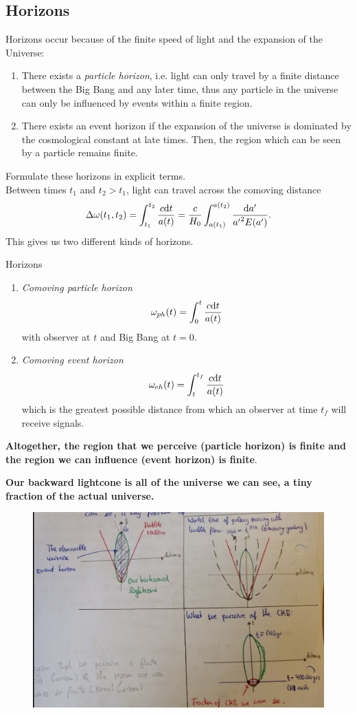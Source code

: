 \subsection{Horizons}
Horizons occur because of the finite speed of light and the expansion of the Universe:
\begin{enumerate}
	\item There exists a \emph{particle horizon}, i.e. light can only travel by a finite distance between the Big Bang and any later time, thus any particle in the universe can only be influenced by events within a finite region.
	\item There exists an event horizon if the expansion of the universe is dominated by the cosmological constant at late times. Then, the region which can be seen by a particle remains finite.
\end{enumerate}
Formulate these horizons in explicit terms.\\
Between times $t_1$ and $t_2 > t_1$, light can travel across the comoving distance
\begin{equation}
	\Delta \omega(t_1,t_2)= \int_{t_1}^{t_2} \frac{c \mathrm{d} t}{a(t)} = \frac{c}{H_0} \int_{a(t_1)}^{a(t_2)} \frac{\mathrm{d} a^\prime}{{a^\prime}^2 E(a^\prime)}.
\end{equation}
This gives us two different kinds of horizons.
\begin{mybox}{Horizons}
	\begin{enumerate} 
		\item 
	\emph{Comoving particle horizon}
	\begin{equation}
		\omega_{ph}(t)=\int_0^t \frac{c \mathrm{d} t}{a(t)}
	\end{equation}
	with observer at $t$ and Big Bang at $t=0$.
	\item \emph{Comoving event horizon}
	\begin{equation}
		\omega_{eh} (t) = \int_t^{t_f} \frac{c \mathrm{d} t}{a(t) }
	\end{equation}
	which is the greatest possible distance from which an observer at time $t_f$ will receive signals.
\end{enumerate}
\textbf{Altogether, the region that we perceive (particle horizon) is finite and the region we can influence (event horizon) is finite}.
\end{mybox}
\textbf{Our backward lightcone is all of the universe we can see, a tiny fraction of the actual universe.}
\begin{figure}[h!]
	\centering
	\includegraphics[width=0.7\linewidth]{gfx/Horizons}
	\caption{}
	\label{fig:horizons}
\end{figure}

